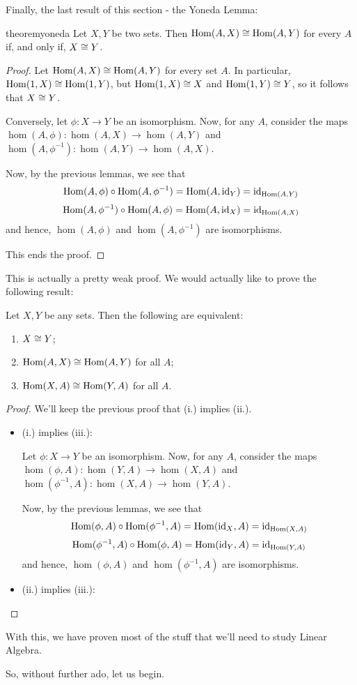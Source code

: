 Finally, the last result of this section - the Yoneda Lemma:

\begin{restatable}{theorem}{yoneda}\label{thm:yoneda1}
	Let $X,Y$ be two sets. Then $\mathrm{Hom}(A,X)\cong\mathrm{Hom}(A,Y)$ for every $A$ if, and only if, $X\cong Y$.
\end{restatable}
\begin{proof}
	Let $\mathrm{Hom}(A,X)\cong \mathrm{Hom}(A,Y)$ for every set $A$. In particular, $\mathrm{Hom}(1,X)\cong\mathrm{Hom}(1,Y)$, but $\mathrm{Hom}(1,X)\cong X$ and $\mathrm{Hom}(1,Y)\cong Y$, so it follows that $X\cong Y$.
	
	\bigskip
	Conversely, let $\phi:X\to Y$ be an isomorphism. Now, for any $A$, consider the maps $\hom(A,\phi):\hom(A,X)\to\hom(A,Y)$ and $\hom(A,\phi^{-1}):\hom(A,Y)\to\hom(A,X)$.
	
	Now, by the previous lemmas, we see that $$\mathrm{Hom}(A,\phi)\circ\mathrm{Hom}(A,\phi^{-1})=\mathrm{Hom}(A,{\rm id}_Y)={\rm id}_{\mathrm{Hom}(A,Y)}$$ $$\mathrm{Hom}(A,\phi^{-1})\circ\mathrm{Hom}(A,\phi)=\mathrm{Hom}(A,{\rm id}_X)={\rm id}_{\mathrm{Hom}(A,X)}$$and hence, $\hom(A,\phi)$ and $\hom(A,\phi^{-1})$ are isomorphisms.
	
	This ends the proof.
\end{proof}

This is actually a pretty weak proof. We would actually like to prove the following result:

\begin{theorem}
	Let $X,Y$ be any sets. Then the following are equivalent:
	\begin{enumerate}[(i.)]
		\item $X\cong Y$;
		\item $\mathrm{Hom}(A,X)\cong\mathrm{Hom}(A,Y)$ for all $A$;
		\item $\mathrm{Hom}(X,A)\cong\mathrm{Hom}(Y,A)$ for all $A$.
	\end{enumerate}
\end{theorem}
\begin{proof}
	We'll keep the previous proof that (i.) implies (ii.).
	
	\begin{itemize}
		\item (i.) implies (iii.):
		
		Let $\phi:X\to Y$ be an isomorphism. Now, for any $A$, consider the maps $\hom(\phi,A):\hom(Y,A)\to\hom(X,A)$ and $\hom(\phi^{-1},A):\hom(X,A)\to\hom(Y,A)$.
		
		Now, by the previous lemmas, we see that $$\mathrm{Hom}(\phi,A)\circ\mathrm{Hom}(\phi^{-1},A)=\mathrm{Hom}({\rm id}_X,A)={\rm id}_{\mathrm{Hom}(X,A)}$$ $$\mathrm{Hom}(\phi^{-1},A)\circ\mathrm{Hom}(\phi,A)=\mathrm{Hom}({\rm id}_Y,A)={\rm id}_{\mathrm{Hom}(Y,A)}$$and hence, $\hom(\phi,A)$ and $\hom(\phi^{-1},A)$ are isomorphisms.
		
		\item (ii.) implies (iii.):
	\end{itemize}
\end{proof}

With this, we have proven most of the stuff that we'll need to study Linear Algebra.

So, without further ado, let us begin.